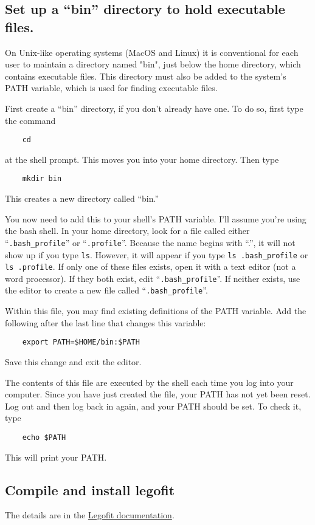 \documentclass[11pt]{article}
\begin{document}
\subsection{Set up a ``bin'' directory to hold executable files.}
On Unix-like operating systems (MacOS and Linux) it is conventional
for each user to maintain a directory named "bin", just below the home
directory, which contains executable files. This directory must also
be added to the system's PATH variable, which is used for finding
executable files.

First create a ``bin'' directory, if you don't already have one. To do
so, first type the command
\begin{verbatim}
    cd
\end{verbatim}
at the shell prompt. This moves you into your home directory. Then
type
\begin{verbatim}
    mkdir bin
\end{verbatim}
This creates a new directory called ``bin.''

You now need to add this to your shell's PATH variable. I'll assume
you're using the bash shell. In your home directory, look for a file
called either ``\verb|.bash_profile|'' or
``\texttt{.profile}''. Because the name begins with ``.'', it will not
show up if you type \texttt{ls}. However, it will appear if you type
\verb|ls .bash_profile| or \verb|ls .profile|. If only one of these
files exists, open it with a text editor (not a word processor). If
they both exist, edit ``\verb|.bash_profile|''. If neither exists, use
the editor to create a new file called ``\verb|.bash_profile|''.

Within this file, you may find existing definitions of the PATH
variable. Add the following after the last line that changes this
variable:
\begin{verbatim}
    export PATH=$HOME/bin:$PATH
\end{verbatim}
Save this change and exit the editor.

The contents of this file are executed by the shell each time you log
into your computer. Since you have just created the file, your PATH
has not yet been reset. Log out and then log back in again, and your
PATH should be set. To check it, type
\begin{verbatim}
    echo $PATH
\end{verbatim}
This will print your PATH.

\subsection{Compile and install legofit}
The details are in the
\href{http://alanrogers.github.io/legofit/html/index.html}{Legofit
  documentation}. 
\end{document}
